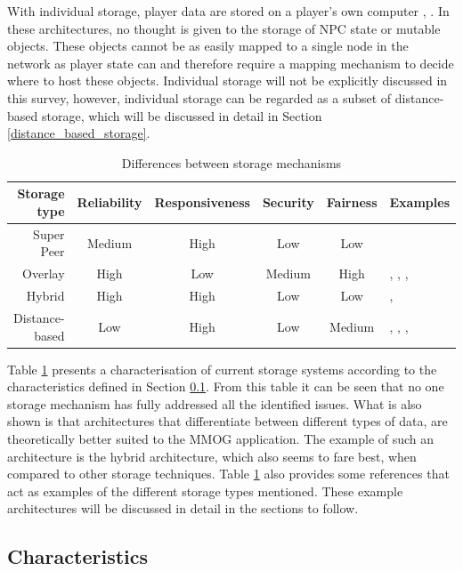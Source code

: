 \documentclass[10pt,a4paper,journal,cspaper,compsoc]{IEEEtran}
\begin{document}
With individual storage, player data are stored on a player's own computer \cite{individual_storage1}, \cite{cheat_proof_playout}. In these
architectures, no thought is given to the storage of NPC state or mutable objects. These objects cannot be as easily mapped to a single node in the
network as player state can and therefore require a mapping mechanism to decide where to host these objects. Individual storage will not be
explicitly discussed in this survey, however, individual storage can be regarded as a subset of distance-based storage, which will be discussed in
detail in Section \ref{distance_based_storage}.

\begin{table}[htbp]
\centering
\begin{tabular}{|r|c|c|c|c|l|}
\hline
Storage type & Reliability & Responsiveness & Security & Fairness & Examples\\
\hline
Super Peer & Medium & High & Low & Low & \cite{knutsson_p2p_first}\\
Overlay & High & Low & Medium & High & \cite{Douglas05enablingmassively}, \cite{using_freenet_storage},
\cite{Fan_phd}, \cite{past_storage_focus}\\
Hybrid & High & High & Low & Low & \cite{zoned_federation}, \cite{hybrid_storage1}\\
Distance-based & Low & High & Low & Medium & \cite{Buyukkaya_voronoi_state_management}, \cite{Hu_voronoi_IM},
\cite{colyseus_distance_based}, \cite{solipsis}\\
\hline
\end{tabular}
\caption{Differences between storage mechanisms} \label{tab_storage}
\end{table}
%
Table \ref{tab_storage} presents a characterisation of current storage systems according to the characteristics defined in Section
\ref{key_challenges_cm}. From this table it can be seen that no one storage mechanism has fully addressed all the identified issues. What is also
shown is that architectures that differentiate between different types of data, are theoretically better suited to the MMOG application. The example
of such an architecture is the hybrid architecture, which also seems to fare best, when compared to other storage techniques. Table \ref{tab_storage}
also provides some references that act as examples of the different storage types mentioned. These example architectures will be discussed in detail
in the sections to follow.

\subsection{Characteristics}
\label{key_challenges_cm}
\end{document}
